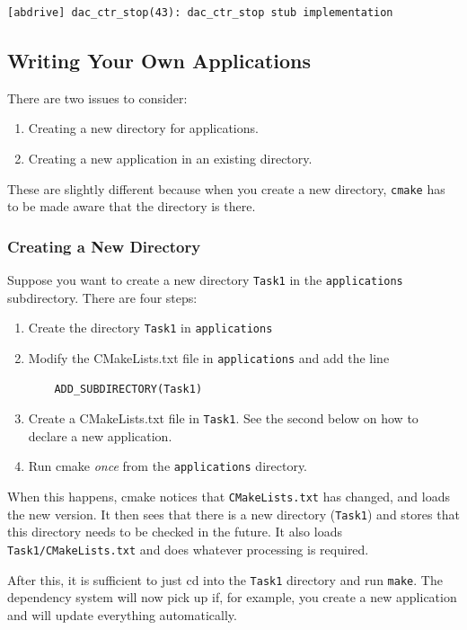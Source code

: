 \documentclass[a4paper]{article}
\begin{document}
\begin{verbatim}
[abdrive] dac_ctr_stop(43): dac_ctr_stop stub implementation
\end{verbatim}

\subsection{Writing Your Own Applications}

There are two issues to consider:
\begin{enumerate}
\item Creating a new directory for applications.
\item Creating a new application in an existing directory.
\end{enumerate}

These are slightly different because when you create a new directory,
\verb+cmake+ has to be made aware that the directory is there.

\subsubsection{Creating a New Directory}

Suppose you want to create a new directory \verb+Task1+ in the
\verb+applications+ subdirectory. There are four steps:

\begin{enumerate}
\item Create the directory \verb+Task1+ in \verb+applications+
\item Modify the CMakeLists.txt file in \verb+applications+ and add the line
  \begin{verbatim}
    ADD_SUBDIRECTORY(Task1)
  \end{verbatim}
\item Create a CMakeLists.txt file in \verb+Task1+. See the second
  below on how to declare a new application.
\item Run cmake \emph{once\/} from the \verb+applications+ directory.
\end{enumerate}

When this happens, cmake notices that \verb+CMakeLists.txt+ has
changed, and loads the new version. It then sees that there is a new
directory (\verb+Task1+) and stores that this directory needs to be
checked in the future. It also loads \verb+Task1/CMakeLists.txt+ and
does whatever processing is required.

After this, it is sufficient to just cd into the \verb+Task1+
directory and run \verb+make+. The dependency system will now pick up
if, for example, you create a new application and will update everything automatically.
\end{document}
